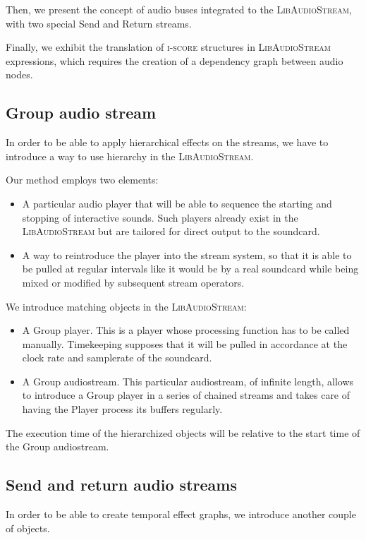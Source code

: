 \documentclass{article}
\newcommand*{\LibAudioStream}{\textsc{LibAudioStream}\xspace}
\newcommand*{\iscore}{\textsc{i-score}\xspace}
\begin{document}
Then, we present the concept of audio buses integrated to the \LibAudioStream,
with two special Send and Return streams.

Finally, we exhibit the translation of \iscore structures in \LibAudioStream expressions, 
which requires the creation of a dependency graph between audio nodes.

\subsection{Group audio stream}
In order to be able to apply hierarchical effects on the streams, 
we have to introduce a way to use hierarchy in the \LibAudioStream.

Our method employs two elements: 
\begin{itemize}
	\item A particular audio player that will be able to sequence the starting and stopping 
	of interactive sounds.
	Such players already exist in the \LibAudioStream but are tailored for direct output to
	the soundcard.
	\item A way to reintroduce the player into the stream system, so that it 
	is able to be pulled at regular intervals like it would be by a real soundcard while being mixed or modified by subsequent stream operators.
\end{itemize}

We introduce matching objects in the \LibAudioStream: 
\begin{itemize}
	\item A Group player. This is a player whose processing function has to be called manually. 
	Timekeeping supposes that it will be pulled in accordance at the clock rate
	and samplerate of the soundcard.
	\item A Group audiostream. This particular audiostream, of infinite length, 
	allows to introduce a Group player in a series of chained streams and takes care of having the Player process its buffers
    regularly.
\end{itemize}

The execution time of the hierarchized objects will be relative to the start time of the Group audiostream.

\subsection{Send and return audio streams}
In order to be able to create temporal effect graphs, we introduce another couple of objects.
\end{document}
